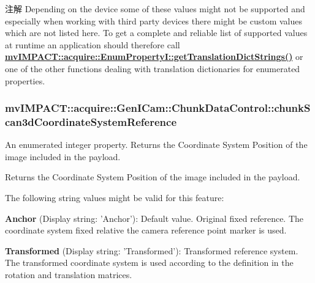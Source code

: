 \begin{DoxyNote}{注解}
Depending on the device some of these values might not be supported and especially when working with third party devices there might be custom values which are not listed here. To get a complete and reliable list of supported values at runtime an application should therefore call {\bfseries \hyperlink{classmv_i_m_p_a_c_t_1_1acquire_1_1_enum_property_i_a0ba6ccbf5ee69784d5d0b537924d26b6}{mv\+I\+M\+P\+A\+C\+T\+::acquire\+::\+Enum\+Property\+I\+::get\+Translation\+Dict\+Strings()}} or one of the other functions dealing with translation dictionaries for enumerated properties. 
\end{DoxyNote}
\hypertarget{classmv_i_m_p_a_c_t_1_1acquire_1_1_gen_i_cam_1_1_chunk_data_control_a15827600dc5405f7893efdcf8dfa0569}{
\subsubsection[{chunk\+Scan3d\+Coordinate\+System\+Reference}]{ mv\+I\+M\+P\+A\+C\+T\+::acquire\+::\+Gen\+I\+Cam\+::\+Chunk\+Data\+Control\+::chunk\+Scan3d\+Coordinate\+System\+Reference}}\label{classmv_i_m_p_a_c_t_1_1acquire_1_1_gen_i_cam_1_1_chunk_data_control_a15827600dc5405f7893efdcf8dfa0569}


An enumerated integer property. Returns the Coordinate System Position of the image included in the payload. 

Returns the Coordinate System Position of the image included in the payload.

The following string values might be valid for this feature\+:
\begin{DoxyItemize}
\item {\bfseries Anchor} (Display string\+: 'Anchor')\+: Default value. Original fixed reference. The coordinate system fixed relative the camera reference point marker is used.
\item {\bfseries Transformed} (Display string\+: 'Transformed')\+: Transformed reference system. The transformed coordinate system is used according to the definition in the rotation and translation matrices.
\end{DoxyItemize}

